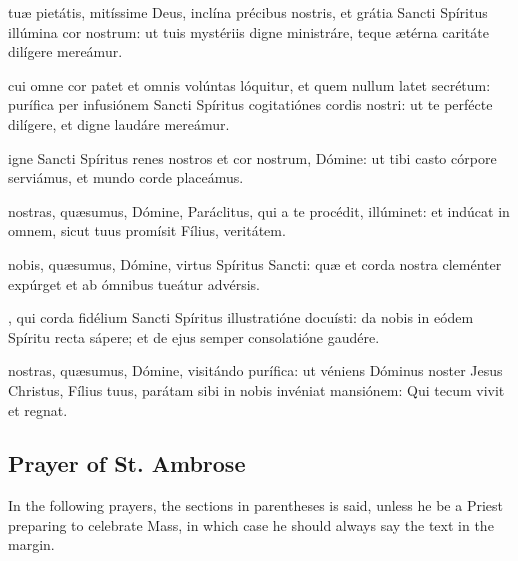{\oremuslatin
{} tu{\ae} pietátis, mitíssime Deus, inclína précibus nostris, et grátia Sancti Spíritus illúmina cor nostrum: ut tuis mystériis digne ministráre, teque {\ae}térna caritáte dilígere mereámur.


 cui omne cor patet et omnis volúntas lóquitur, et quem nullum latet secrétum: purífica per infusiónem Sancti Spíritus cogitatiónes cordis nostri: ut te perfécte dilígere, et digne laudáre mereámur.


 igne Sancti Spíritus renes nostros et cor nostrum, Dómine: ut tibi casto córpore serviámus, et mundo corde placeámus.


 nostras, qu{\ae}sumus, Dómine, Paráclitus, qui a te procédit, illúminet: et indúcat in omnem, sicut tuus promísit Fílius, veritátem.


 nobis, qu{\ae}sumus, Dómine, virtus Spíritus Sancti: qu{\ae} et corda nostra cleménter expúrget et ab ómnibus tueátur advérsis.


, qui corda fidélium Sancti Spíritus illustratióne docuísti: da nobis in eódem Spíritu recta sápere; et de ejus semper consolatióne gaudére.


 nostras, qu{\ae}sumus, Dómine, visitándo purífica: ut véniens Dóminus noster Jesus Christus, Fílius tuus, parátam sibi in nobis invéniat mansiónem: Qui tecum vivit et regnat.}

\subsection{Prayer of St. Ambrose}
\begin{rubric}
	In the following prayers, the sections in parentheses is said, unless he be a Priest preparing to celebrate Mass, in which case he should always say the text in the margin.
\end{rubric}
